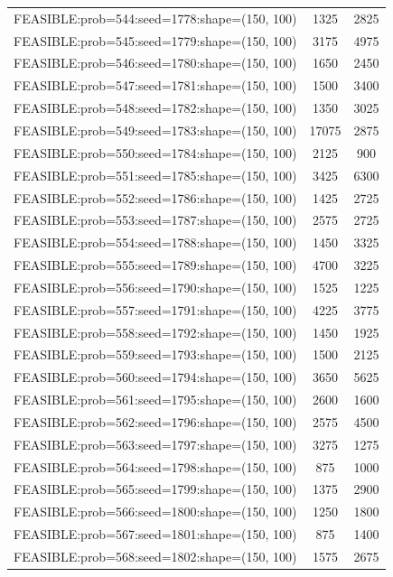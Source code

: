 \begin{longtable}{lcc}
FEASIBLE:prob=544:seed=1778:shape=(150, 100) &     1325 &  2825 \\
FEASIBLE:prob=545:seed=1779:shape=(150, 100) &     3175 &  4975 \\
FEASIBLE:prob=546:seed=1780:shape=(150, 100) &     1650 &  2450 \\
FEASIBLE:prob=547:seed=1781:shape=(150, 100) &     1500 &  3400 \\
FEASIBLE:prob=548:seed=1782:shape=(150, 100) &     1350 &  3025 \\
FEASIBLE:prob=549:seed=1783:shape=(150, 100) &    17075 &  2875 \\
FEASIBLE:prob=550:seed=1784:shape=(150, 100) &     2125 &   900 \\
FEASIBLE:prob=551:seed=1785:shape=(150, 100) &     3425 &  6300 \\
FEASIBLE:prob=552:seed=1786:shape=(150, 100) &     1425 &  2725 \\
FEASIBLE:prob=553:seed=1787:shape=(150, 100) &     2575 &  2725 \\
FEASIBLE:prob=554:seed=1788:shape=(150, 100) &     1450 &  3325 \\
FEASIBLE:prob=555:seed=1789:shape=(150, 100) &     4700 &  3225 \\
FEASIBLE:prob=556:seed=1790:shape=(150, 100) &     1525 &  1225 \\
FEASIBLE:prob=557:seed=1791:shape=(150, 100) &     4225 &  3775 \\
FEASIBLE:prob=558:seed=1792:shape=(150, 100) &     1450 &  1925 \\
FEASIBLE:prob=559:seed=1793:shape=(150, 100) &     1500 &  2125 \\
FEASIBLE:prob=560:seed=1794:shape=(150, 100) &     3650 &  5625 \\
FEASIBLE:prob=561:seed=1795:shape=(150, 100) &     2600 &  1600 \\
FEASIBLE:prob=562:seed=1796:shape=(150, 100) &     2575 &  4500 \\
FEASIBLE:prob=563:seed=1797:shape=(150, 100) &     3275 &  1275 \\
FEASIBLE:prob=564:seed=1798:shape=(150, 100) &      875 &  1000 \\
FEASIBLE:prob=565:seed=1799:shape=(150, 100) &     1375 &  2900 \\
FEASIBLE:prob=566:seed=1800:shape=(150, 100) &     1250 &  1800 \\
FEASIBLE:prob=567:seed=1801:shape=(150, 100) &      875 &  1400 \\
FEASIBLE:prob=568:seed=1802:shape=(150, 100) &     1575 &  2675 \\

\end{longtable}
